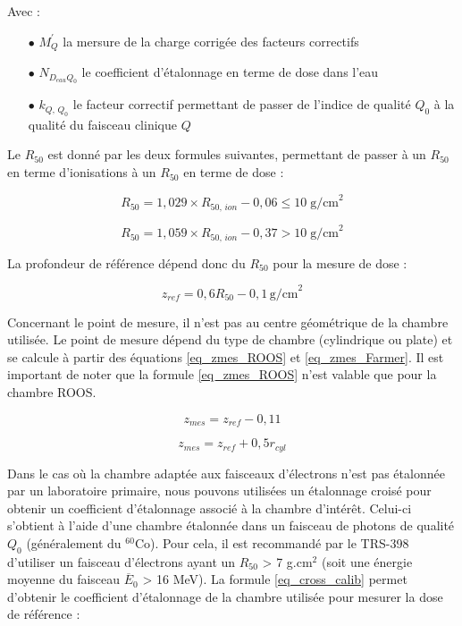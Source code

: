 \documentclass{article}
\begin{document}
Avec :
\begin{itemize}
  \item[$\bullet$] $M_Q^{'}$ la mersure de la charge corrigée des facteurs correctifs
  \item[$\bullet$] $N_{D_{eau} Q_0}$ le coefficient d'étalonnage en terme de dose dans l'eau
  \item[$\bullet$] $k_{Q,\, Q_0}$ le facteur correctif permettant de passer de l'indice de qualité $Q_0$ à la qualité du faisceau clinique $Q$
\end{itemize}

Le $R_{50}$ est donné par les deux formules suivantes, permettant de passer à un $R_{50}$ en terme d'ionisations à un $R_{50}$ en terme de dose :

\begin{equation}
  R_{50} = 1,029 \times R_{50,\, ion} - 0,06 \leq 10\; \text{g/cm}^2
\end{equation}

\begin{equation}
  R_{50} = 1,059 \times R_{50,\, ion} - 0,37 > 10\; \text{g/cm}^2
\end{equation}

La profondeur de référence dépend donc du $R_{50}$ pour la mesure de dose :

\begin{equation}
  z_{ref} = 0,6 R_{50} - 0,1 \, \text{g/cm}^2
\end{equation}

Concernant le point de mesure, il n'est pas au centre géométrique de la chambre utilisée. Le point de mesure dépend du type de chambre (cylindrique ou plate) et se calcule à partir des équations \ref*{eq_zmes_ROOS} et \ref*{eq_zmes_Farmer}. Il est important de noter que la formule \ref*{eq_zmes_ROOS} n'est valable que pour la chambre ROOS.

\begin{equation}
  z_{mes} = z_{ref} - 0,11
  \label{eq_zmes_ROOS}
\end{equation}

\begin{equation}
  z_{mes} = z_{ref} + 0,5 r_{cyl}
  \label{eq_zmes_Farmer}
\end{equation}

Dans le cas où la chambre adaptée aux faisceaux d'électrons n'est pas étalonnée par un laboratoire primaire, nous pouvons utilisées un étalonnage croisé pour obtenir un coefficient d'étalonnage associé à la chambre d'intérêt. Celui-ci s'obtient à l'aide d'une chambre étalonnée dans un faisceau de photons de qualité $Q_0$ (généralement du $^{60}$Co). Pour cela, il est recommandé par le TRS-398 d'utiliser un faisceau d'électrons ayant un $R_{50}$ > 7 g.cm$^2$ (soit une énergie moyenne du faisceau $\overline{E}_0$ > 16 MeV). La formule \ref*{eq_cross_calib} permet d'obtenir le coefficient d'étalonnage de la chambre utilisée pour mesurer la dose de référence :
\end{document}
